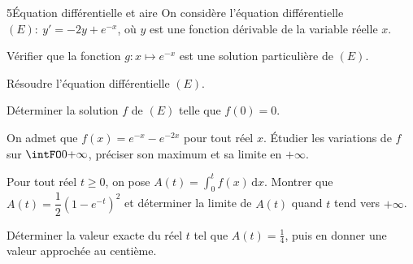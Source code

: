\begin{exoBac}{5}{Équation différentielle et aire}
On considère l'équation différentielle $(E):\ y'=-2y+e^{-x}$, où $y$ est une fonction dérivable de la variable réelle $x$.
\begin{questions}
  \item Vérifier que la fonction $g:x\mapsto e^{-x}$ est une solution particulière de $(E)$.
  \item Résoudre l'équation différentielle $(E)$.
  \item Déterminer la solution $f$ de $(E)$ telle que $f(0)=0$.
  \item On admet que $f(x)=e^{-x}-e^{-2x}$ pour tout réel $x$. Étudier les variations de $f$ sur $\intFO0{+\infty}$, préciser son
    maximum et sa limite en $+\infty$.
  \item Pour tout réel $t\geq0$, on pose $A(t)=\displaystyle\int_0^{t}f(x)\,\mathrm{d}x$. Montrer que $A(t)=\dfrac12\left(1-e^{-t}\right)^{2}$
    et déterminer la limite de $A(t)$ quand $t$ tend vers $+\infty$.
  \item Déterminer la valeur exacte du réel $t$ tel que $A(t)=\frac14$, puis en donner une valeur approchée au centième.
\end{questions}
\end{exoBac}
